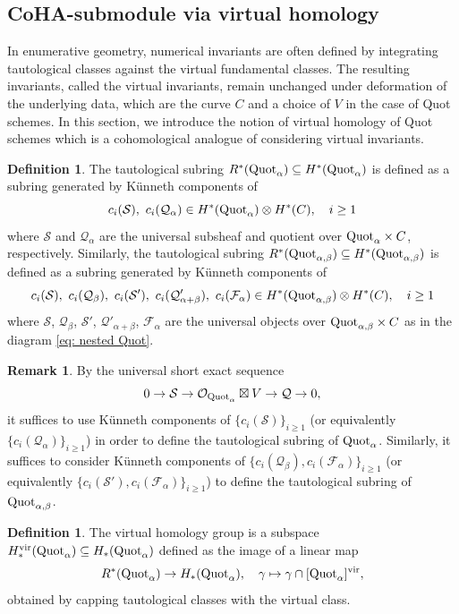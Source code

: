 \documentclass[10pt]{amsart}
\newcommand{\CO}{\mathcal{O}}
\newcommand{\CS}{\mathcal{S}}
\newcommand{\CQ}{\mathcal{Q}}
\newcommand{\CF}{\mathcal{F}}
\newcommand{\Quot}{\textnormal{Quot}}
\newcommand{\+}{{}^+}
\newcommand{\vir}{\textnormal{vir}}
\theoremstyle{definition}
\theoremstyle {definition}
\newtheorem{remark}[theorem]{Remark}
\theoremstyle {definition}
\newtheorem{definition}[theorem]{Definition}
\begin{document}
\subsection{CoHA-submodule via virtual homology}

In enumerative geometry, numerical invariants are often defined by integrating tautological classes against the virtual fundamental classes. The resulting invariants, called the virtual invariants, remain unchanged under deformation of the underlying data, which are the curve $C$ and a choice of $V$ in the case of Quot schemes. In this section, we introduce the notion of virtual homology of Quot schemes which is a cohomological analogue of considering virtual invariants. 

\begin{definition}\label{def: tautological subring}
    The tautological subring $R^*(\Quot_\alpha)\subseteq H^*(\Quot_\alpha)$ is defined as a subring generated by K\"unneth components of
    $$c_i(\CS),\ c_i(\CQ_\alpha)\in H^*(\Quot_\alpha)\otimes H^*(C),\quad i\geq 1$$
    where $\CS$ and $\CQ_\alpha$ are the universal subsheaf and quotient over $\Quot_\alpha\times C$, respectively. Similarly, the tautological subring $R^*(\Quot_{\alpha,\beta})\subseteq H^*(\Quot_{\alpha,\beta})$ is defined as a subring generated by K\"unneth components of
    $$c_i(\CS),\ c_i(\CQ_\beta),\ c_i(\CS'),\ c_i(\CQ'_{\alpha+\beta}),\ c_i(\CF_\alpha)\in H^*(\Quot_{\alpha,\beta})\otimes H^*(C),\quad i\geq 1$$
    where $\CS$, $\CQ_\beta$, $\CS'$, $\CQ'_{\alpha+\beta}$, $\CF_\alpha$ are the universal objects over $\Quot_{\alpha,\beta}\times C$ as in the diagram \eqref{eq: nested Quot}. 
    
\end{definition}

\begin{remark}\label{rem: taut generation}
    By the universal short exact sequence
    $$0\rightarrow \CS\rightarrow \CO_{\Quot_{\alpha}}\boxtimes V\rightarrow \CQ\rightarrow 0,
    $$
    it suffices to use K\"unneth components of $\{c_i(\CS)\}_{i\geq 1}$ (or equivalently $\{c_i(\CQ_\alpha)\}_{i\geq 1}$) in order to define the tautological subring of $\Quot_\alpha$. Similarly, it suffices to consider K\"unneth components of $\{c_i(\CQ_\beta), c_i(\CF_\alpha)\}_{i\geq 1}$ (or equivalently $\{c_i(\CS'), c_i(\CF_\alpha)\}_{i\geq 1}$) to define the tautological subring of $\Quot_{\alpha,\beta}$. 
\end{remark}

\begin{definition}\label{def: virtual homology}
    The virtual homology group is a subspace $H^\vir_*(\Quot_\alpha)\subseteq H_*(\Quot_\alpha)$ defined as the image of a linear map
    $$R^*(\Quot_\alpha)\rightarrow H_*(\Quot_\alpha),\quad \gamma\mapsto \gamma\cap[\Quot_\alpha]^\vir,
$$
obtained by capping tautological classes with the virtual class. 
\end{definition}
\end{document}
